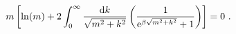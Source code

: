 \begin{equation}
m \left[ \ln (m) +2 \int_0^{\infty}\frac{{\rm d}k}{\sqrt{m^2+k^2}}
\left( \frac{1}{{\rm e}^{\beta \sqrt{m^2+k^2}}+1}\right) \right] = 0 \ .
\label{t30}
\end{equation}


